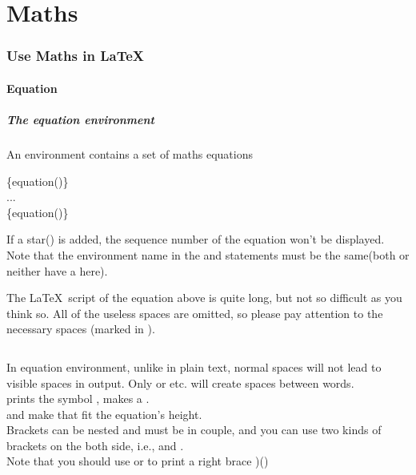 \part{Maths}

\section{Use Maths in \LaTeX}
\begin{frame}
\end{frame}

\subsection{Equation}

\begin{frame}
	\frametitle{The equation environment}
	An  environment contains a set of maths equations
	\begin{command}
		\{equation(\structure{*})\}\\
		\qquad ...\\
		\{equation(\structure{*})\}\\
	\end{command}
	\begin{example}
		
	\end{example}
	If a star(\structure{*}) is added, the sequence number of the equation won't be displayed. Note that the environment name in the  and  statements must be the same(both or neither have a \structure{*} here).
\end{frame}

\begin{frame}[fragile]
	The \LaTeX\ script of the equation above is quite long, but not so difficult as you think so. All of the useless spaces are omitted, so please pay attention to the necessary spaces (marked in \textvisiblespace).

	
	\inputminted[showspaces]{latex}{examples/curl.tex}
	
	In equation environment, unlike in plain text, normal spaces will not lead to visible spaces in output. Only \structure{\textbackslash\textvisiblespace } or \LC{\quad,\qquad} etc. will create spaces between words. \\
	\LC{\partial} prints the symbol \structure{$\partial$},  makes a . \\
	\LC{\left(} and \LC{\right(} make  that fit the equation's height. \\
	Brackets can be nested and must be in couple, and you can use two kinds of brackets on the both side, i.e., \LC{\left[} and \LC{\right\rbrace}. \\
	Note that you should use \LC{\rbrace} or \LC{\}} to print a right brace )(\structure{$\rbrace$}) \\
\end{frame}

